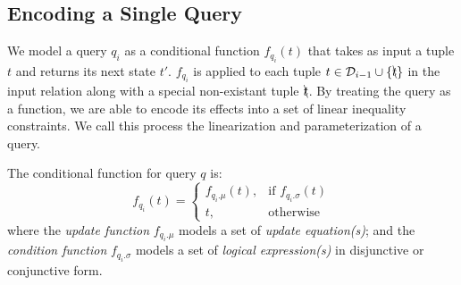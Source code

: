 \subsection{Encoding a Single Query}%
\label{sec:linearize}

  We model a query $q_i$ as a conditional function $f_{q_i}(t)$ that takes as input a tuple $t$
  and returns its next state $t'$.  $f_{q_i}$ is applied to each 
  tuple $t \in \mathcal{D}_{i-1} \cup \{\bcancel{t}\}$ in the input relation along with a special
  non-existant tuple $\bcancel{t}$. 
  By treating the query as a function, we are able to encode its effects into a set
  of linear inequality constraints.  We call this process the linearization and 
  parameterization of a query.

  \begin{definition} 
  \label{def:cond}
    The conditional function for query $q$ is:
    \[
      f_{q_i}(t)= 
      \begin{cases}
      f_{q_i.\mu} (t) ,& \text{if } f_{q_i.\sigma} (t)\\
      t,              & \text{otherwise}
      \end{cases}
  \]
  where the \textit{update function} $f_{q_i.\mu}$ models a set of \textit{update equation(s)};
  and the \textit{condition function} $f_{q_i.\sigma}$ models a set of \textit{logical expression(s)} in 
  disjunctive or conjunctive form.
  \end{definition} 



